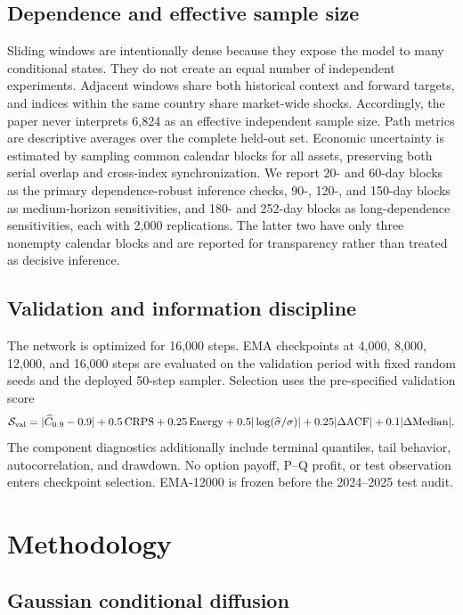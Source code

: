 ﻿\documentclass[12pt,letterpaper]{article}
\begin{document}
\subsection{Dependence and effective sample size}

Sliding windows are intentionally dense because they expose the model to many
conditional states. They do not create an equal number of independent
experiments. Adjacent windows share both historical context and forward
targets, and indices within the same country share market-wide shocks.
Accordingly, the paper never interprets 6{,}824 as an effective independent
sample size. Path metrics are descriptive averages over the complete held-out
set. Economic uncertainty is estimated by sampling common calendar blocks for
all assets, preserving both serial overlap and cross-index synchronization.
We report 20- and 60-day blocks as the primary dependence-robust inference
checks, 90-, 120-, and 150-day blocks as medium-horizon sensitivities, and
180- and 252-day blocks as long-dependence sensitivities, each with 2{,}000
replications. The latter two have only three nonempty calendar blocks and are
reported for transparency rather than treated as decisive inference.

\subsection{Validation and information discipline}

The network is optimized for 16{,}000 steps. EMA checkpoints at 4{,}000,
8{,}000, 12{,}000, and 16{,}000 steps are evaluated on the validation period
with fixed random seeds and the deployed 50-step sampler. Selection uses the
pre-specified validation score
\begin{equation}
\mathcal S_{\rm val}=|\widehat C_{0.9}-0.9|+0.5\,\mathrm{CRPS}
+0.25\,\mathrm{Energy}+0.5|\log(\widehat\sigma/\sigma)|
+0.25|\Delta\mathrm{ACF}|+0.1|\Delta\mathrm{Median}|.
\end{equation}
The component diagnostics additionally include terminal quantiles, tail
behavior, autocorrelation, and drawdown. No option
payoff, P--Q profit, or test observation enters checkpoint selection.
EMA-12000 is frozen before the 2024--2025 test audit.

\section{Methodology}\label{sec:method}


\subsection{Gaussian conditional diffusion}\label{sec:ddpm}
\end{document}
